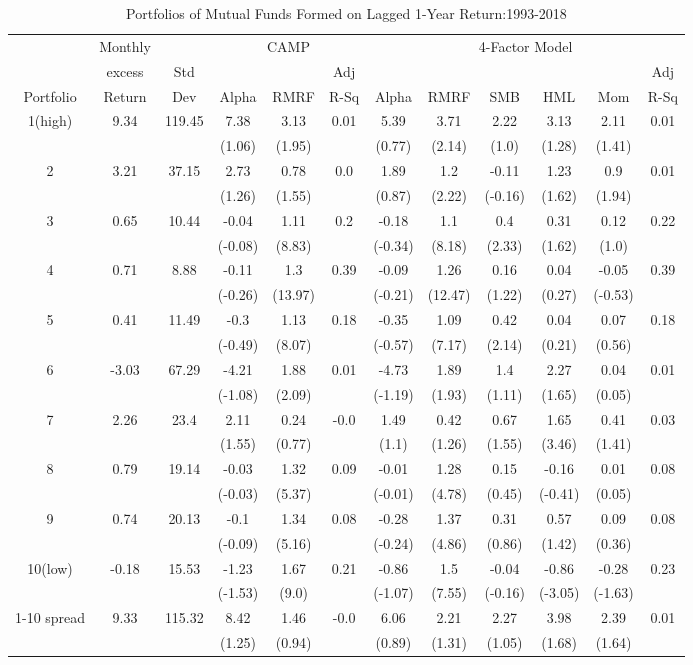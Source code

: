 \documentclass[a4paper]{article}
\begin{document}
\begin{table}[h!]
    \centering
    \begin{tabular}{c cc ccc cccccc} 
    \toprule[1.5pt]
      &  Monthly &  & \multicolumn{3}{c}{CAMP} &  \multicolumn{6}{c}{4-Factor Model}\\
      & excess& Std &   &  & Adj &   &  &  &  &  & Adj\\
     Portfolio & Return & Dev & Alpha  & RMRF & R-Sq &  Alpha  & RMRF & SMB & HML & Mom &  R-Sq\\
    
    \toprule[1.5pt]
    1(high)&9.34&119.45&7.38&3.13&0.01&5.39&3.71&2.22&3.13&2.11&0.01\\
    &&&(1.06)&(1.95)&&(0.77)&(2.14)&(1.0)&(1.28)&(1.41)&\\
    2&3.21&37.15&2.73&0.78&0.0&1.89&1.2&-0.11&1.23&0.9&0.01\\
    &&&(1.26)&(1.55)&&(0.87)&(2.22)&(-0.16)&(1.62)&(1.94)&\\
    3&0.65&10.44&-0.04&1.11&0.2&-0.18&1.1&0.4&0.31&0.12&0.22\\
    &&&(-0.08)&(8.83)&&(-0.34)&(8.18)&(2.33)&(1.62)&(1.0)&\\
    4&0.71&8.88&-0.11&1.3&0.39&-0.09&1.26&0.16&0.04&-0.05&0.39\\
    &&&(-0.26)&(13.97)&&(-0.21)&(12.47)&(1.22)&(0.27)&(-0.53)&\\
    5&0.41&11.49&-0.3&1.13&0.18&-0.35&1.09&0.42&0.04&0.07&0.18\\
    &&&(-0.49)&(8.07)&&(-0.57)&(7.17)&(2.14)&(0.21)&(0.56)&\\
    6&-3.03&67.29&-4.21&1.88&0.01&-4.73&1.89&1.4&2.27&0.04&0.01\\
    &&&(-1.08)&(2.09)&&(-1.19)&(1.93)&(1.11)&(1.65)&(0.05)&\\
    7&2.26&23.4&2.11&0.24&-0.0&1.49&0.42&0.67&1.65&0.41&0.03\\
    &&&(1.55)&(0.77)&&(1.1)&(1.26)&(1.55)&(3.46)&(1.41)&\\
    8&0.79&19.14&-0.03&1.32&0.09&-0.01&1.28&0.15&-0.16&0.01&0.08\\
    &&&(-0.03)&(5.37)&&(-0.01)&(4.78)&(0.45)&(-0.41)&(0.05)&\\
    9&0.74&20.13&-0.1&1.34&0.08&-0.28&1.37&0.31&0.57&0.09&0.08\\
    &&&(-0.09)&(5.16)&&(-0.24)&(4.86)&(0.86)&(1.42)&(0.36)&\\
    10(low)&-0.18&15.53&-1.23&1.67&0.21&-0.86&1.5&-0.04&-0.86&-0.28&0.23\\
    &&&(-1.53)&(9.0)&&(-1.07)&(7.55)&(-0.16)&(-3.05)&(-1.63)&\\
    1-10 spread&9.33&115.32&8.42&1.46&-0.0&6.06&2.21&2.27&3.98&2.39&0.01\\
    &&&(1.25)&(0.94)&&(0.89)&(1.31)&(1.05)&(1.68)&(1.64)&\\
    
    \toprule[1.5pt]
    \end{tabular}
    \caption{Portfolios of Mutual Funds Formed on Lagged 1-Year Return:1993-2018}
    \label{table:1}
    \end{table}
\end{document}
